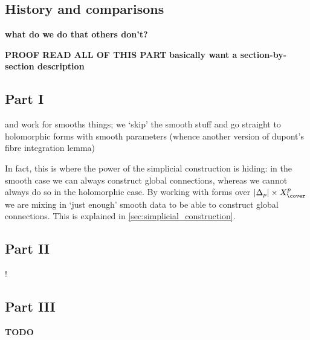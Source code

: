 
        \subsection{History and comparisons} %
        \label{sub:history_and_comparisons}

            {\color{red}\textbf{what do we do that others don't?}}
        
    
    {\color{red}\textbf{PROOF READ ALL OF THIS PART}}
    {\color{red}\textbf{basically want a section-by-section description}}

        \subsection*{Part I} %
        \label{sub:part_i}
        
            {\color{red}\cite{Green:1980wpa} and \cite{Dupont:1976up} work for smooths things; we `skip' the smooth stuff and go straight to holomorphic forms with smooth parameters (whence another version of dupont's fibre integration lemma)}

            {\color{red}In fact, this is where the power of the simplicial construction is hiding: in the smooth case we can always construct global connections, whereas we cannot always do so in the holomorphic case. By working with forms over $|\Delta_p|\times X^p_\cover$ we are mixing in `just enough' smooth data to be able to construct global connections. This is explained in \cref{sec:simplicial_construction}.}


        \subsection{Part II} %
        \label{sub:part_ii}

            !
        

        \subsection*{Part III} %
        \label{sub:part_iii}

            {\color{red}\textbf{TODO}}

